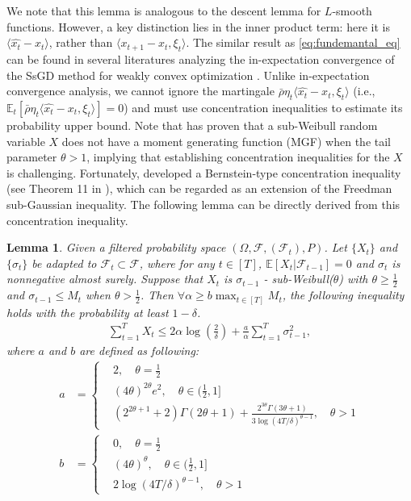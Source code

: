 \documentclass{article}
\newtheorem{lemma}{Lemma}
\def \E {\mathbb{E}}
\begin{document}
We note that this lemma is analogous to the descent lemma for $L$-smooth functions. However, a key distinction lies in the inner product term: here it is $\langle \hat{x_t} - x_t \rangle$, rather than $\langle x_{t+1} - x_t, \xi_t \rangle$. The similar result as \eqref{eq:fundemantal_eq} can be found  in several literatures analyzing the in-expectation convergence of the SsGD method for weakly convex optimization \citep{Davis_2018,Davis2_2018,Alacaoglu_2020,quanqihu_2024}. Unlike in-expectation convergence analysis, we cannot ignore the martingale $\bar{\rho}\eta_t\langle \hat{x_t}-x_t,\xi_t\rangle$ (i.e., $\E_t[\bar{\rho}\eta_t\langle \hat{x_t}-x_t,\xi_t\rangle]=0$) and must use concentration inequalities to estimate its probability upper bound. Note that \cite{bakhshizadeh_2022} has proven that a sub-Weibull random variable $X$ does not have a moment generating function (MGF) when the tail parameter $\theta>1$, implying that establishing concentration inequalities for the $X$ is challenging. Fortunately, \cite{madden_2024} developed a Bernstein-type concentration inequality (see Theorem 11 in \citep{madden_2024}), which can be regarded as an extension of the Freedman sub-Gaussian inequality. The following lemma can be directly derived from this concentration inequality.
\begin{lemma}\label{lem:sub_weibull_freedman_ineq}
    Given a filtered probability space $(\Omega,\mathcal{F},(\mathcal{F}_t),P)$. Let $\{X_t\}$ and $\{\sigma_t\}$ be adapted to $\mathcal{F}_t\subset \mathcal{F}$, where for any $t\in[T]$, $\E[X_t|\mathcal{F}_{t-1}]=0$ and $\sigma_t$ is nonnegative almost surely. Suppose that $X_t$ is $\sigma_{t-1}$ - sub-Weibull($\theta$) with $\theta\geq\frac{1}{2}$ and $\sigma_{t-1}\leq M_t$ when $\theta>\frac{1}{2}$. Then $\forall \alpha\geq b\max_{t\in[T]}M_t$, the following inequality holds with the probability at least $1-\delta$.
    \begin{align}\label{eq:sub_weibull_freedman_ineq}
    \sum_{t=1}^T X_t \leq 2\alpha\log(\frac{2}{\delta}) + \frac{a}{\alpha}\sum_{t=1}^T \sigma_{t-1}^2, 
\end{align}
where $a$ and $b$ are defined as following:
\begin{align}
    a &= \left\{\begin{aligned}
        &2,\quad \theta = \frac{1}{2}\\
        &(4\theta)^{2\theta}e^2,\quad \theta\in(\frac{1}{2},1]\\
        &(2^{2\theta+1}+2)\Gamma(2\theta+1) + \frac{2^{3\theta}\Gamma(3\theta+1)}{3\log(4T/\delta)^{\theta-1}}, \quad \theta>1
    \end{aligned}\right.\\
    b &= \left\{\begin{aligned}
        &0,\quad \theta = \frac{1}{2}\\
        &(4\theta)^\theta,\quad \theta \in (\frac{1}{2},1]\\
        &2\log(4T/\delta)^{\theta-1},\quad \theta > 1
    \end{aligned}\right.
\end{align}
\end{lemma}
\end{document}
